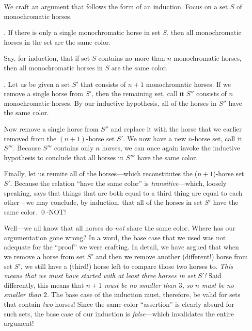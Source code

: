 \smallskip

We craft an argument that follows the form of an induction.  Focus on a set $S$ of monochromatic horses.

\smallskip

.
If there is only a single monochromatic horse in set $S$, then all monochromatic horses in the set are the same color.

\smallskip

Say, for induction, that if set $S$ contains no more than $n$ monochromatic horses, then all monochromatic horses in $S$ are the same color.

\smallskip

.
Let us be given a set $S'$ that consists of $n+1$ monochromatic horses.  If we remove a single 
horse from $S'$, then the remaining set, call it $S''$ consists of $n$ monochromatic horses.  By our inductive hypothesis, all of the horses in $S''$ have the same color.

Now remove a single horse from $S''$ and replace it with the horse that we earlier removed from the $(n+1)$-horse set $S'$.  We now have a new $n$-horse set, call it $S'''$.  Because $S'''$ contains only $n$ horses, we can once again invoke the inductive hypothesis to conclude that all horses in $S'''$ have the same color.

\smallskip

Finally, let us reunite all of the horses---which reconstitutes the ($n+1$)-horse set $S'$.  Because the relation ``have the same color'' is {\em transitive}---which, loosely speaking, says that things that are both equal to a third thing are equal to each other---we may conclude, by induction, that all of the horses in set $S'$ have the same color.  \qed-NOT!

\medskip

Well---we all know that all horses do {\em not} share the same color.  Where has our argumentation gone wrong?  In a word, the base case that we used was not adequate for the ``proof'' we were crafting.  In detail, we have argued that when we remove a horse from set $S'$ and then we remove another (different!) horse from set $S'$, we still have a (third!) horse left to compare those two horses to.  {\em This means that we must have started with at least {\em three} horses in set $S'$!}  Said differently, this means that {\em $n+1$ must be no smaller than $3$, so $n$ must be no smaller than $2$.}  The base case of the induction must, therefore, be valid for sets that contain {\em two} horses!  Since the same-color ``assertion'' is clearly absurd for such sets, the base case of our induction is {\em false}---which invalidates the entire argument!

